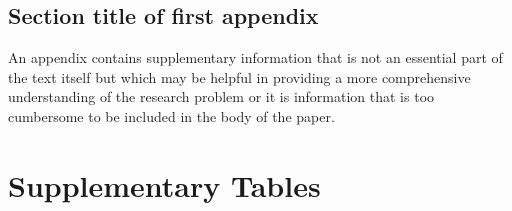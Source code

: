 \documentclass[pdflatex,sn-nature]{sn-jnl}%
\theoremstyle{thmstyleone}%
\theoremstyle{thmstyletwo}%
\theoremstyle{thmstylethree}%
\begin{document}
\begin{appendices}

\section{Section title of first appendix}\label{secA1}

An appendix contains supplementary information that is not an essential part of the text itself but which may be helpful in providing a more comprehensive understanding of the research problem or it is information that is too cumbersome to be included in the body of the paper.




\end{appendices}






\appendix

\section{Supplementary Tables}\label{sec:appendix-tables}

\setcounter{table}{0}
\renewcommand{\thetable}{A\arabic{table}}




\end{document}
